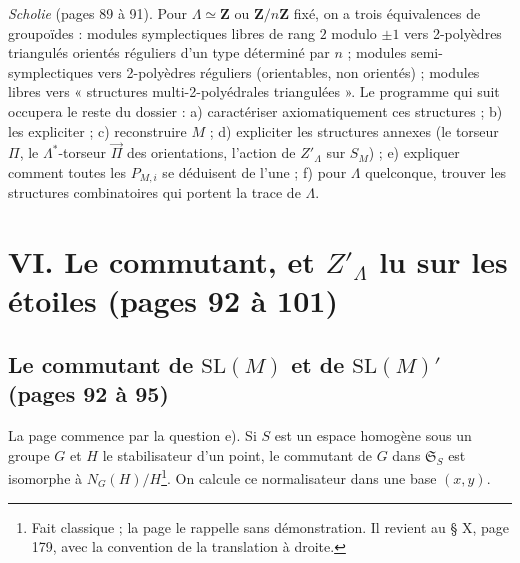 \documentclass[11pt,a4paper]{article}
\begin{document}
\emph{Scholie} (pages 89 à 91). Pour $\Lambda \simeq \mathbf{Z}$ ou
$\mathbf{Z}/n\mathbf{Z}$ fixé, on a trois équivalences de groupoïdes : modules
symplectiques libres de rang $2$ modulo $\pm 1$ vers 2-polyèdres triangulés
orientés réguliers d'un type déterminé par $n$ ; modules semi-symplectiques vers
2-polyèdres réguliers (orientables, non orientés) ; modules libres vers
« structures multi-2-polyédrales triangulées ». Le programme qui suit occupera
le reste du dossier : a) caractériser axiomatiquement ces structures ; b) les
expliciter ; c) reconstruire $M$ ; d) expliciter les structures annexes (le
torseur $\Pi$, le $\Lambda^{*}$-torseur $\overrightarrow{\Pi}$ des orientations,
l'action de $Z'_\Lambda$ sur $S_M$) ; e) expliquer comment toutes les $P_{M,i}$
se déduisent de l'une ; f) pour $\Lambda$ quelconque, trouver les structures
combinatoires qui portent la trace de $\Lambda$.

\section*{VI. Le commutant, et $Z'_\Lambda$ lu sur les étoiles (pages 92 à 101)}

\subsection*{Le commutant de $\mathrm{SL}(M)$ et de $\mathrm{SL}(M)'$ (pages 92 à 95)}

La page commence par la question e). Si $S$ est un espace homogène sous un
groupe $G$ et $H$ le stabilisateur d'un point, le commutant de $G$ dans
$\mathfrak{S}_S$ est isomorphe à $N_G(H)/H$\footnote{Fait classique ; la page
le rappelle sans démonstration. Il revient au § X, page 179, avec la
convention de la translation à droite.}. On calcule ce normalisateur dans une
base $(x, y)$.
\end{document}
